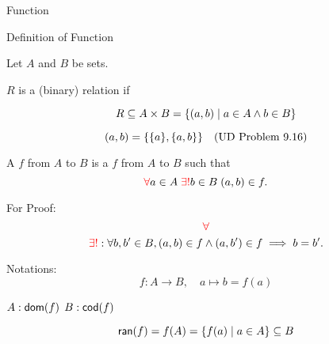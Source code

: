 \begin{frame}{}
  \begin{center}
    {\LARGE Function}

    \pause

    \pause
    \vspace{0.20cm}
    \centerline{\Large {}}
  \end{center}
\end{frame}

\begin{frame}{}
  \begin{center}
    {\LARGE Definition of Function}
  \end{center}
\end{frame}

\begin{frame}{}
  \begin{definition}[Relation]
    \centerline{Let $A$ and $B$ be sets.}

    $R$ is a (binary) relation if

    \[
      R \subseteq A \times B = \{(a, b) \mid a \in A \land b \in B\}
    \]
  \end{definition}

  \pause
  \vspace{0.30cm}
  \[
    (a,b) = \{\{a\}, \{a,b\}\} \quad \text{(UD Problem $9.16$)}
  \]
\end{frame}

\begin{frame}{}
  \begin{definition}[Function]
    A  $f$ from $A$ to $B$ is a  $f$ from $A$ to $B$ such that
    \[
      \textcolor{red}{\forall} a \in A\; \textcolor{red}{\exists!} b \in B\; (a, b) \in f.
    \]
  \end{definition}

  \pause
  \begin{alertblock}{For Proof:}
    \[
      \textcolor{red}{\forall}
    \]
    \[
      \textcolor{red}{\exists!}: \forall b, b' \in B, (a, b) \in f \land (a, b') \in f \implies b = b'.
    \]
  \end{alertblock}

  \pause
  \begin{exampleblock}{Notations:}
    \[
      f: A \to B, \quad a \mapsto b = f(a)
    \]

    \centerline{$A: \textsf{dom}(f)$ \qquad $B: \textsf{cod}(f)$}

    \[
      \textsf{ran}(f) = f(A) = \{f(a) \mid a \in A\} \subseteq B
    \]
  \end{exampleblock}
\end{frame}

